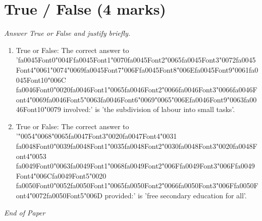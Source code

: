 \documentclass[12pt]{article}
\begin{document}
\section*{True / False (4 marks)}
\textit{Answer True or False and justify briefly.}
\begin{enumerate}[label=\arabic*.]
\item True or False: The correct answer to '{\csname fa0045Font0\endcsname\char"004F}{\csname fa0045Font1\endcsname\char"0070}{\csname fa0045Font2\endcsname\char"0065}{\csname fa0045Font3\endcsname\char"0072}{\csname fa0045Font4\endcsname\char"0061}{\char"0074}{\char"0069}{\csname fa0045Font7\endcsname\char"006F}{\csname fa0045Font8\endcsname\char"006E}{\csname fa0045Font9\endcsname\char"0061}{\csname fa0045Font10\endcsname\char"006C} {\csname fa0046Font0\endcsname\char"0020}{\csname fa0046Font1\endcsname\char"0065}{\csname fa0046Font2\endcsname\char"0066}{\csname fa0046Font3\endcsname\char"0066}{\csname fa0046Font4\endcsname\char"0069}{\csname fa0046Font5\endcsname\char"0063}{\csname fa0046Font6\endcsname\char"0069}{\char"0065}{\char"006E}{\csname fa0046Font9\endcsname\char"0063}{\csname fa0046Font10\endcsname\char"0079} involved:' is 'the subdivision of labour into small tasks'.
\item True or False: The correct answer to '{\char"0054}{\char"0068}{\char"0065}{\csname fa0047Font3\endcsname\char"0020}{\csname fa0047Font4\endcsname\char"0031} {\csname fa0048Font0\endcsname\char"0039}{\csname fa0048Font1\endcsname\char"0035}{\csname fa0048Font2\endcsname\char"0030}{\csname fa0048Font3\endcsname\char"0020}{\csname fa0048Font4\endcsname\char"0053} {\csname fa0049Font0\endcsname\char"0063}{\csname fa0049Font1\endcsname\char"0068}{\csname fa0049Font2\endcsname\char"006F}{\csname fa0049Font3\endcsname\char"006F}{\csname fa0049Font4\endcsname\char"006C}{\csname fa0049Font5\endcsname\char"0020} {\csname fa0050Font0\endcsname\char"0052}{\csname fa0050Font1\endcsname\char"0065}{\csname fa0050Font2\endcsname\char"0066}{\csname fa0050Font3\endcsname\char"006F}{\csname fa0050Font4\endcsname\char"0072}{\csname fa0050Font5\endcsname\char"006D} provided:' is 'free secondary education for all'.
\end{enumerate}

\vfill
\noindent\textit{End of Paper}
\end{document}
